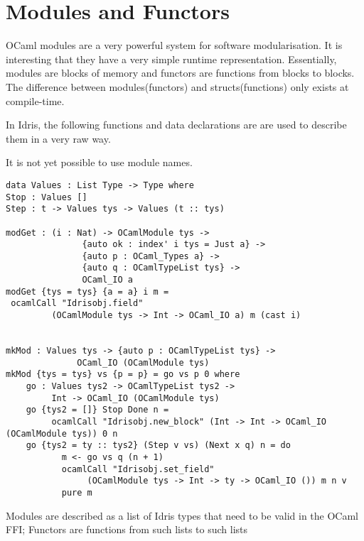 \section{Modules and Functors} 
OCaml modules are a very powerful system for software modularisation. 
It is interesting that they have a very simple runtime representation.
Essentially,  modules are blocks of memory and functors are functions
from blocks to blocks. The difference between modules(functors) and
structs(functions) only exists at compile-time.

In Idris, the following functions and data declarations are are used to 
describe them in a very raw way.

It is not yet possible to use module names.

\begin{listing}[H]
    \begin{verbatim}
data Values : List Type -> Type where
Stop : Values []
Step : t -> Values tys -> Values (t :: tys)
      
modGet : (i : Nat) -> OCamlModule tys ->
               {auto ok : index' i tys = Just a} ->
               {auto p : OCaml_Types a} -> 
               {auto q : OCamlTypeList tys} ->
               OCaml_IO a
modGet {tys = tys} {a = a} i m = 
 ocamlCall "Idrisobj.field"
         (OCamlModule tys -> Int -> OCaml_IO a) m (cast i)
      
      
mkMod : Values tys -> {auto p : OCamlTypeList tys} ->
              OCaml_IO (OCamlModule tys)
mkMod {tys = tys} vs {p = p} = go vs p 0 where
    go : Values tys2 -> OCamlTypeList tys2 ->
         Int -> OCaml_IO (OCamlModule tys)
    go {tys2 = []} Stop Done n =
         ocamlCall "Idrisobj.new_block" (Int -> Int -> OCaml_IO (OCamlModule tys)) 0 n
    go {tys2 = ty :: tys2} (Step v vs) (Next x q) n = do
           m <- go vs q (n + 1)
           ocamlCall "Idrisobj.set_field" 
                (OCamlModule tys -> Int -> ty -> OCaml_IO ()) m n v
           pure m
\end{verbatim}
\caption{Modules are described as a list of Idris types that need to 
be valid in the OCaml FFI; Functors are functions from such lists to
such lists}
\end{listing}





